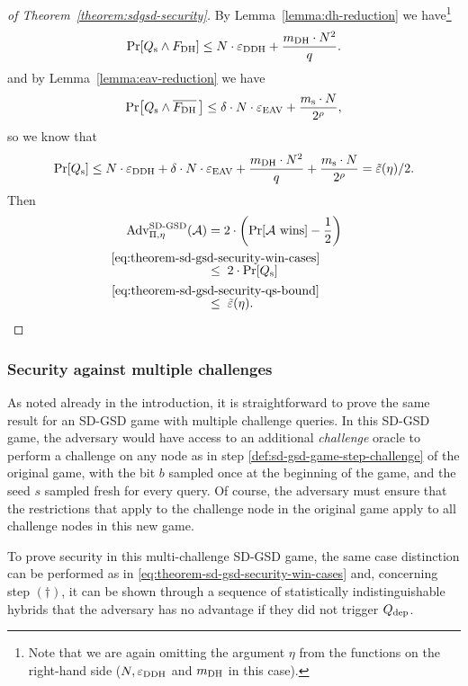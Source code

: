 \begin{proof}[of Theorem~\ref{theorem:sdgsd-security}]
	By Lemma~\ref{lemma:dh-reduction} we have\footnote{Note that we are again omitting the argument $\eta$ from the functions on the right-hand side ($N, \varepsilon_\mathrm{DDH}$ and $m_\mathrm{DH}$ in this case).}
	\[
		\pr{\qs \land \fdh} \le N \cdot \eddh + \frac{\mdh \cdot N^2}{q}.
	\]
	and by Lemma~\ref{lemma:eav-reduction} we have
	\[
		\pr{\qs \land \overline{\fdh}\,} \le \delta \cdot N \cdot \eeav + \frac{\ms \cdot N}{2^\rho},
	\]
	so we know that
	\begin{equation} \label{eq:theorem-sd-gsd-security-qs-bound}
		\pr{\qs} \le N \cdot \eddh + \delta \cdot N \cdot \eeav + \frac{\mdh \cdot N^2}{q} + \frac{\ms \cdot N}{2^\rho} = \tilde{\epsilon}(\eta) / 2.
	\end{equation}
	Then
	\begin{align*}
		\advantage{\Pi}{\eta}{SD\text{-}GSD}(\adv) & = 2 \cdot \left(\pr{\wins} - \frac{1}{2}\right)                                                   \\
		                                           & \stackrel{\mathclap{\eqref{eq:theorem-sd-gsd-security-win-cases}}}{\le} \; 2 \cdot \pr{\qs}       \\
		                                           & \stackrel{\mathclap{\eqref{eq:theorem-sd-gsd-security-qs-bound}}}{\le} \; \tilde{\epsilon}(\eta).
	\end{align*}
\end{proof}

\subsubsection{Security against multiple challenges} \label{sec:sd-gsd-multi-challenge-security}
As noted already in the introduction, it is straightforward to prove the same result for an SD-GSD game with multiple challenge queries. In this SD-GSD game, the adversary would have access to an additional \emph{challenge} oracle to perform a challenge on any node as in step \ref{def:sd-gsd-game-step-challenge} of the original game, with the bit $b$ sampled once at the beginning of the game, and the seed $s$ sampled fresh for every query. Of course, the adversary must ensure that the restrictions that apply to the challenge node in the original game apply to all challenge nodes in this new game.

To prove security in this multi-challenge SD-GSD game, the same case distinction can be performed as in \eqref{eq:theorem-sd-gsd-security-win-cases} and, concerning step $(\dagger)$, it can be shown through a sequence of statistically indistinguishable hybrids that the adversary has no advantage if they did not trigger $Q_\mathrm{dep}$.

